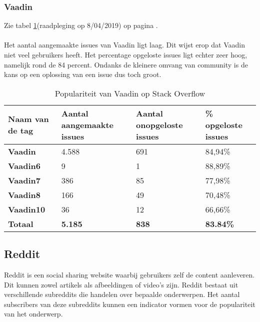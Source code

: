 \subsubsection{Vaadin}
Zie tabel \ref{table:vaadinstackoverflow}(raadpleging op 8/04/2019) op pagina \pageref{table:vaadinstackoverflow}. \\ \\
Het aantal aangemaakte issues van Vaadin ligt laag. Dit wijst erop dat Vaadin niet veel gebruikers heeft. Het percentage opgeloste issues ligt echter zeer hoog, namelijk rond de 84 percent. Ondanks de kleinere omvang van community is de kans op een oplossing van een issue dus toch groot. \\

\begin{table}[H]
	\begin{tabular}{|l|l|l|l|}
		\hline
		Naam van de tag   & \textbf{Aantal aangemaakte issues} & \textbf{Aantal onopgeloste issues} & \textbf{\% opgeloste issues} \\ \hline
		\textbf{Vaadin}  & 4.588                            & 691                             & 84,94\%                              \\ \hline
		\textbf{Vaadin6} & 9                              & 1                              & 88,89\%                              \\ \hline
		\textbf{Vaadin7} & 386                              & 85                              & 77,98\%                              \\ \hline
		\textbf{Vaadin8} & 166                                & 49                                & 70,48\%                              \\ \hline
		\textbf{Vaadin10} & 36                                & 12                                & 66,66\%                              \\ \hline
		\textbf{Totaal}   & \textbf{5.185}                   & \textbf{838}                    & \textbf{83.84\%}                     \\ \hline
	\end{tabular}
	\caption{Populariteit van Vaadin op Stack Overflow}
	\label{table:vaadinstackoverflow}
\end{table}

\subsection{Reddit}
Reddit is een social sharing website waarbij gebruikers zelf de content aanleveren. Dit kunnen zowel artikels als afbeeldingen of video's zijn. Reddit bestaat uit verschillende subreddits die handelen over bepaalde onderwerpen. Het aantal subscribers van deze subreddits kunnen een indicator vormen voor de populariteit van het onderwerp.\\

